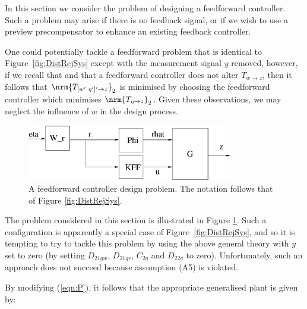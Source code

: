 \label{sec:Preproc}
In this section we consider the problem of designing a feedforward controller. Such a problem may arise if there is no feedback signal, or if we wish to use a preview precompensator to enhance an existing feedback controller. 


One could potentially tackle a feedforward problem that is identical to Figure~\ref{fig:DistRejSys} except with the measurement signal $y$ removed, however, if we recall that 
and that a feedforward controller does not alter $T_{w\rightarrow z}$, then it follows that $\nrm{T_{[w'\,\, \eta']'\rightarrow z}}_2$ is minimised by choosing the feedforward controller which minimises $\nrm{T_{\eta \rightarrow z}}_2$.  Given these observations, we may neglect the influence of $w$ in the design process.

\begin{figure}
\begin{center}
\stdcontrolfrags
{}
\includegraphics[width=9cm]{./diags/DistRejSysFF.eps}
\end{center}
\caption{A feedforward controller design problem. The notation follows that of Figure \ref{fig:DistRejSys}.\label{fig:DistRejSysFF}}
\end{figure}

The problem considered in this section is illustrated in Figure \ref{fig:DistRejSysFF}. Such a configuration is apparently a special case of Figure~\ref{fig:DistRejSys}, and so it is tempting to try to tackle this problem by using the above general theory with $y$ set to zero (by setting $D_{21gw}$, $D_{21gr}$, $C_{2g}$ and $D_{22g}$ to zero). Unfortunately, such an approach does not succeed because assumption (A5) is violated.

By modifying (\ref{eqn:P}), it follows that the appropriate generalised plant is given by:

